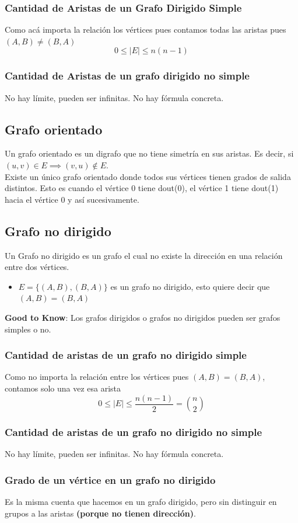 \documentclass[10pt,a4paper]{article}
\begin{document}
\subsubsection*{Cantidad de Aristas de un Grafo Dirigido Simple}
Como acá importa la relación los vértices pues contamos todas las aristas pues $(A,B) \neq (B,A)$ \[0 \leq |E| \leq n(n-1)\]
\subsubsection*{Cantidad de Aristas de un grafo dirigido no simple}
No hay límite, pueden ser infinitas. No hay fórmula concreta.
\subsection*{Grafo orientado}
Un grafo orientado es un digrafo que no tiene simetría en sus aristas. Es decir, si $ (u, v) \in E  \implies (v, u) \notin E$. \\
Existe un único grafo orientado donde todos sus vértices tienen grados de salida distintos. Esto es cuando el vértice 0 tiene dout(0), el vértice 1 tiene dout(1) hacia el vértice 0 y así sucesivamente.
\subsection*{Grafo no dirigido}
Un Grafo no dirigido es un grafo el cual no existe la dirección en una relación entre dos vértices.
\begin{itemize}
    \item $E = \{(A,B), (B, A) \}$ es un grafo no dirigido, esto quiere decir que $(A,B) = (B, A)$
\end{itemize}
\textbf{Good to Know}: Los grafos dirigidos o grafos no dirigidos pueden ser grafos simples o no.
\subsubsection*{Cantidad de aristas de un grafo no dirigido simple}
Como no importa la relación entre los vértices pues $(A,B) = (B,A)$, contamos solo una vez esa arista \[0 \leq |E| \leq \frac{n(n-1)}{2} = \binom{n}{2}\]
\subsubsection*{Cantidad de aristas de un grafo no dirigido no simple}
No hay límite, pueden ser infinitas. No hay fórmula concreta.
\subsubsection*{Grado de un vértice en un grafo no dirigido}
Es la misma cuenta que hacemos en un grafo dirigido, pero sin distinguir en grupos a las aristas \textbf{(porque no tienen dirección)}.
\end{document}
